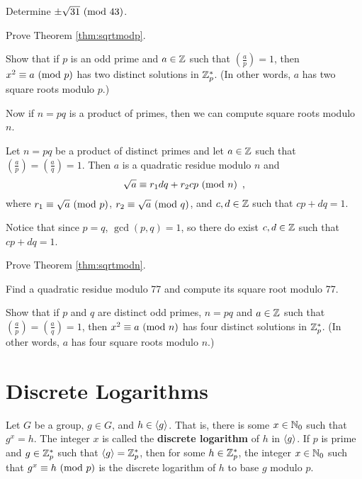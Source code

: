 \begin{problem}[10 points]
Determine $\pm\sqrt{31}\mbox{\ $\left(\mathrm{mod}\ {43}\right)$}$.
\end{problem}

\begin{problem}[15 points]
Prove Theorem \ref{thm:sqrtmodp}.
\end{problem}

\begin{problem}[10 points]
Show that if $p$ is an odd prime and $a\in\mathbb{Z}$ such that $\left(\frac{a}{p}\right)=1$, then $x^2 \equiv a \mbox{\ $\left(\mathrm{mod}\ {p}\right)$}$ has two distinct solutions in $\mathbb{Z}_p^*$. (In other words, $a$ has two square roots modulo $p$.)
\end{problem}

Now if $n=pq$ is a product of primes, then we can compute square roots modulo $n$.
\begin{theorem}
\label{thm:sqrtmodn}
Let $n=pq$ be a product of distinct primes and let $a\in\mathbb{Z}$ such that $\left(\frac{a}{p}\right)=\left(\frac{a}{q}\right)=1$. Then $a$ is a quadratic residue modulo $n$ and
$$\sqrt{a} \equiv r_1dq + r_2cp \mbox{\ $\left(\mathrm{mod}\ {n}\right)$}\enspace ,$$
where $r_1 \equiv \sqrt{a} \mbox{\ $\left(\mathrm{mod}\ {p}\right)$}$, $r_2 \equiv \sqrt{a} \mbox{\ $\left(\mathrm{mod}\ {q}\right)$}$, and $c,d\in\mathbb{Z}$ such that $cp+dq = 1$.
\end{theorem}
Notice that since $p=q$, $\gcd(p,q)=1$, so there do exist $c,d\in\mathbb{Z}$ such that $cp+dq=1$.

\begin{problem}[15 points]
Prove Theorem \ref{thm:sqrtmodn}.
\end{problem}

\begin{problem}[10 points]
Find a quadratic residue modulo 77 and compute its square root modulo 77.
\end{problem}

\begin{problem}[15 points]
Show that if $p$ and $q$ are distinct odd primes, $n=pq$ and $a\in\mathbb{Z}$ such that $\left(\frac{a}{p}\right)=\left(\frac{a}{q}\right)=1$, then $x^2 \equiv a \mbox{\ $\left(\mathrm{mod}\ {n}\right)$}$ has four distinct solutions in $\mathbb{Z}_p^*$. (In other words, $a$ has four square roots modulo $n$.)
\end{problem}



	\section{Discrete Logarithms}

	\begin{definition}
		Let $G$ be a group, $g\in G$, and $h\in\left\langle g\right\rangle$. That is, there is some $x\in\mathbb{N}_0$ such that $g^x = h$. The integer $x$ is called the {\bf discrete logarithm} of $h$ in $\left\langle g\right\rangle$.
		If $p$ is prime and $g\in\mathbb{Z}_p^*$ such that $\left\langle g\right\rangle = \mathbb{Z}_p^*$, then for some $h\in\mathbb{Z}_p^*$, the integer $x\in\mathbb{N}_0$ such that $g^x \equiv h \mbox{\ $\left(\mathrm{mod}\ {p}\right)$}$ is the discrete logarithm of $h$ to base $g$ modulo $p$.
	\end{definition}


